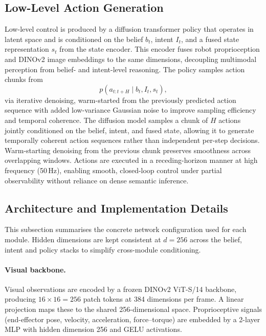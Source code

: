 \documentclass[12pt]{article}
\begin{document}
\subsection{Low-Level Action Generation}
Low-level control is produced by a diffusion transformer policy that operates in latent space and is conditioned on the belief $b_t$, intent $I_t$, and a fused state representation $s_t$ from the state encoder. This encoder fuses robot proprioception and DINOv2 image embeddings to the same dimensions, decoupling multimodal perception from belief- and intent-level reasoning. The policy samples action chunks from
\begin{equation}
p\!\left(a_{t:t+H} \mid b_t, I_t, s_t \right) ,
\end{equation}
via iterative denoising, warm-started from the previously predicted action sequence with added low-variance Gaussian noise to improve sampling efficiency and temporal coherence. The diffusion model samples a chunk of $H$ actions jointly conditioned on the belief, intent, and fused state, allowing it to generate temporally coherent action sequences rather than independent per-step decisions. Warm-starting denoising from the previous chunk preserves smoothness across overlapping windows. Actions are executed in a receding-horizon manner at high frequency (50\,Hz), enabling smooth, closed-loop control under partial observability without reliance on dense semantic inference.

\subsection{Architecture and Implementation Details}
\label{subsec:arch}
This subsection summarises the concrete network configuration used for each module. Hidden dimensions are kept consistent at $d = 256$ across the belief, intent and policy stacks to simplify cross-module conditioning.

\paragraph{Visual backbone.} Visual observations are encoded by a frozen DINOv2 ViT-S/14 \cite{oquab2023dinov2} backbone, producing $16 \times 16 = 256$ patch tokens at 384 dimensions per frame. A linear projection maps these to the shared 256-dimensional space. Proprioceptive signals (end-effector pose, velocity, acceleration, force--torque) are embedded by a 2-layer MLP with hidden dimension 256 and GELU activations.
\end{document}
